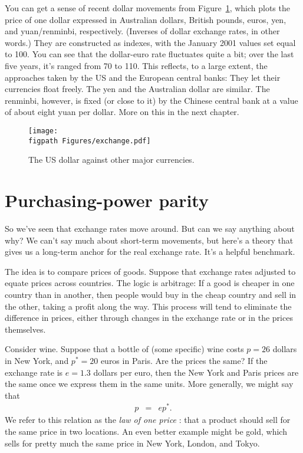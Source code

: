 You can get a sense of recent dollar movements from
Figure~\ref{fig:exch_rates},
which plots the price of one dollar expressed in Australian dollars,
British pounds, euros, yen, and yuan/renminbi, respectively.
(Inverses of dollar exchange rates, in other words.)
They are constructed as indexes, with the January 2001 values
set equal to 100.
You can see that the dollar-euro rate fluctuates quite a bit;
over the last five years, it's ranged from 70 to 110.
This reflects, to a large extent, the approaches taken by
the US and the European central banks:
They let their currencies float freely.
The yen and the Australian dollar
are similar.
The renminbi, however, is fixed (or close to it)
by the Chinese central bank  at a value of about eight yuan per dollar.
More on this in the next chapter.

%
\begin{figure}[!ht]
    \caption{The US dollar against other major currencies.}
    \label{fig:exch_rates}
    \centering
    \texttt{[image: \\figpath Figures/exchange.pdf]}
\end{figure}
%


\section{Purchasing-power parity 
}

So we've seen that exchange rates move around.
But can we say anything about why?
We can't say much about short-term movements,
but here's a theory that gives us a long-term anchor
for the real exchange rate.
It's a helpful benchmark.

The idea is to compare prices of goods.
Suppose that exchange rates adjusted to equate prices across countries.
The logic is arbitrage:  If a good is cheaper in one
country than in another, then people would buy in the cheap country
and sell in the other, taking a profit along the way.
This process will tend to eliminate the difference in prices,
either through changes in the exchange rate or in the prices themselves.

Consider wine.
Suppose that a bottle of (some specific) wine costs $p=26$ dollars in New York,
and $p^*=20$ euros in Paris.
Are the prices the same?
If the exchange rate is $e=1.3$ dollars per euro,
then the New York and Paris prices are the same once we express them
in the same units.
More generally, we might say that
\begin{eqnarray*}
    p &=& e p^* .
\end{eqnarray*}
We refer to this relation as the {\it law of one price  \/}:
that a product should sell for the same price in two locations.
An even better example might be gold,
which sells for pretty much the same price in
New York, London, and Tokyo.

